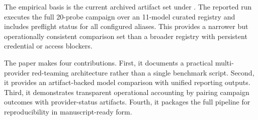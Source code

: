 The empirical basis is the current archived artifact set under
. The reported run executes the full 20-probe
campaign over an 11-model curated registry and includes preflight status for
all configured aliases. This provides a narrower but operationally consistent
comparison set than a broader registry with persistent credential or access
blockers.

The paper makes four contributions. First, it documents a practical
multi-provider red-teaming architecture rather than a single benchmark script.
Second, it provides an artifact-backed model comparison with unified reporting
outputs. Third, it demonstrates transparent operational accounting by pairing
campaign outcomes with provider-status artifacts. Fourth, it packages the full
pipeline for reproducibility in manuscript-ready form.
